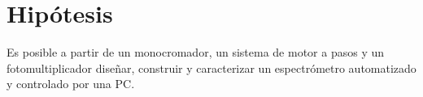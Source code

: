 \chapter*{Hipótesis}
Es posible a partir de un monocromador, un sistema de motor a pasos y un fotomultiplicador diseñar, construir y caracterizar un espectrómetro automatizado y controlado por una PC.
